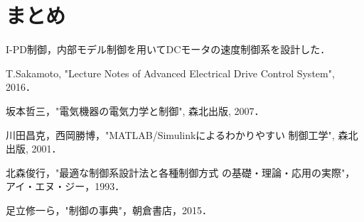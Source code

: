 \documentclass[a4paper,12pt]{jarticle}
\begin{document}
\section{まとめ}
I-PD制御，内部モデル制御を用いてDCモータの速度制御系を設計した．
%
\begin{thebibliography}{99}

  T.Sakamoto,
		 "Lecture Notes of Advanced Electrical Drive Control System",
		 2016．

  坂本哲三，"電気機器の電気力学と制御", 森北出版, 2007．

  川田昌克，西岡勝博，"MATLAB/Simulinkによるわかりやすい
		 制御工学", 森北出版, 2001．

  北森俊行，"最適な制御系設計法と各種制御方式
		 の基礎・理論・応用の実際"，アイ・エヌ・ジー，1993．

 足立修一ら，"制御の事典"，朝倉書店，2015．
		 
\end{thebibliography}
\end{document}

